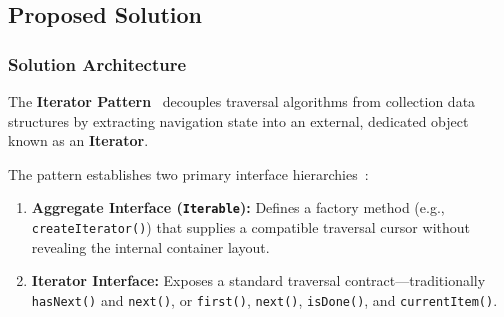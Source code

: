 \subsection{Proposed Solution}

\subsubsection{Solution Architecture}
The \textbf{Iterator Pattern}~\cite{gof1994} decouples traversal algorithms from collection data structures by extracting navigation state into an external, dedicated object known as an \textbf{Iterator}. 

The pattern establishes two primary interface hierarchies~\cite{gof1994, refactoring_guru_iterator}:
\begin{enumerate}
    \item \textbf{Aggregate Interface (\texttt{Iterable}):} Defines a factory method (e.g., \texttt{createIterator()}) that supplies a compatible traversal cursor without revealing the internal container layout.
    \item \textbf{Iterator Interface:} Exposes a standard traversal contract—traditionally \texttt{hasNext()} and \texttt{next()}, or \texttt{first()}, \texttt{next()}, \texttt{isDone()}, and \texttt{currentItem()}.
\end{enumerate}

